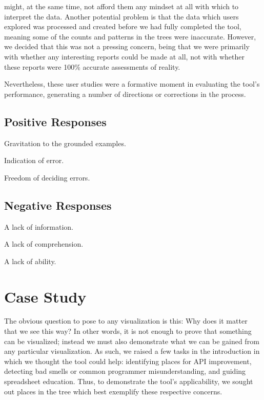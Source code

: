 \documentclass[conference]{IEEEtran}
\begin{document}
might, at the same time, not afford them any mindset at all with which to 
interpret the data. Another potential problem is that the data which users
explored was processed and created before we had fully completed the tool,
meaning some of the counts and patterns in the trees were inaccurate. 
However, we decided that this was not a pressing concern, being that we 
were primarily with whether any interesting reports could be made at all, 
not with whether these reports were 100\% accurate assessments of reality. \par
Nevertheless, these user studies were a formative moment in evaluating
the tool's performance, generating a number of directions or corrections
in the process. \par
\subsection{Positive Responses}
Gravitation to the grounded examples. \par
Indication of error. \par 
Freedom of deciding errors.
\subsection{Negative Responses}
A lack of information. \par 
A lack of comprehension. \par 
A lack of ability.

\section{Case Study}
The obvious question to pose to any visualization is this: Why does it matter that we see this way? In other words, it is not enough to prove that something can be visualized; instead we must also demonstrate what we can be gained from any particular visualization. As such, we raised a few tasks in the introduction in which we thought the tool could help: identifying places for API improvement, detecting bad smells or common programmer misunderstanding, and guiding spreadsheet education. Thus, to demonstrate the tool's applicability, we sought out places in the tree which best exemplify these respective concerns.
\end{document}
